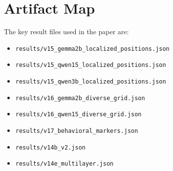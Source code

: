 \documentclass[11pt]{article}
\begin{document}
\section{Artifact Map}

The key result files used in the paper are:
\begin{itemize}
    \item \texttt{results/v15\_gemma2b\_localized\_positions.json}
    \item \texttt{results/v15\_qwen15\_localized\_positions.json}
    \item \texttt{results/v15\_qwen3b\_localized\_positions.json}
    \item \texttt{results/v16\_gemma2b\_diverse\_grid.json}
    \item \texttt{results/v16\_qwen15\_diverse\_grid.json}
    \item \texttt{results/v17\_behavioral\_markers.json}
    \item \texttt{results/v14b\_v2.json}
    \item \texttt{results/v14e\_multilayer.json}
\end{itemize}



\end{document}
